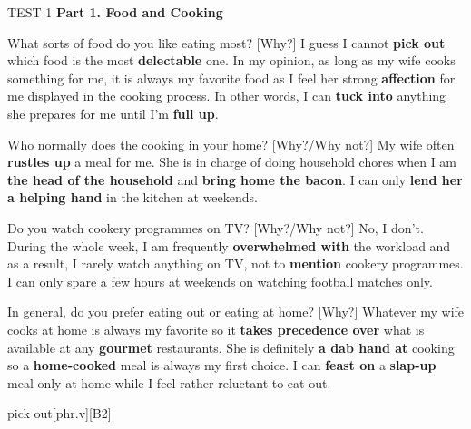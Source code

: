 \begin{glossarymc}[Cambridge 11]
    \begin{test}{TEST 1}
    \noindent
    \textbf{Part 1. Food and Cooking}
    \begin{qa}{What sorts of food do you like eating most? [Why?]}
    I guess I cannot \textbf{pick out} which food is the most \textbf{delectable} one. In my opinion, as long as my wife cooks something for me, it is always my favorite food as I feel her strong \textbf{affection} for me displayed in the cooking process. In other words, I can \textbf{tuck into} anything she prepares for me until I’m \textbf{full up}.
    \end{qa}

    \begin{qa}{Who normally does the cooking in your home? [Why?/Why not?]}
    My wife often \textbf{rustles up} a meal for me. She is in charge of doing household chores when I am \textbf{the head of the household} and \textbf{bring home the bacon}. I can only \textbf{lend her a helping hand} in the kitchen at weekends.
    \end{qa}

    \begin{qa}{Do you watch cookery programmes on TV? [Why?/Why not?]}
    No, I don’t. During the whole week, I am frequently \textbf{overwhelmed with} the workload and as a result, I rarely watch anything on TV, not to \textbf{mention} cookery programmes. I can only spare a few hours at weekends on watching football matches only.
    \end{qa}

    \begin{qa}{In general, do you prefer eating out or eating at home? [Why?]}
    Whatever my wife cooks at home is always my favorite so it \textbf{takes precedence over} what is available at any \textbf{gourmet} restaurants. She is definitely \textbf{a dab hand at} cooking so a \textbf{home-cooked} meal is always my first choice. I can \textbf{feast on} a \textbf{slap-up} meal only at home while I feel rather reluctant to eat out.
    \end{qa}

        \begin{VocabExplain}[Part 1]
            \begin{ExplainCard}{pick out}[phr.v][B2]
            \end{ExplainCard}


\end{VocabExplain}
\end{test}
\end{glossarymc}
